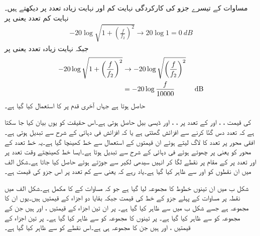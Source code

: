 مساوات  کے تیسرے جزو  کی کارکردگی نہایت کم اور نہایت زیادہ تعدد پر دیکھتے ہیں۔نہایت کم تعدد یعنی  پر
\begin{align} \label{مساوات_تعدد_ردعمل_بوڈا_کم_تعدد_تیسرا_حصہ}
-20 \log \sqrt{1+\left(\frac{f}{f_2}\right)^2} \to 20 \log 1 =\SI{0}{dB}
\end{align}
جبکہ نہایت زیادہ تعدد یعنی  پر 
\begin{gather}
\begin{aligned} \label{مساوات_تعدد_ردعمل_بوڈا_زیادہ_تعدد_تیسرا_حصہ}
-20 \log  \sqrt{1+\left(\frac{f}{f_2}\right)^2} &\to -20 \log \sqrt{\left(\frac{f}{f_2}\right)^2} \\
&=-20 \log \frac{f}{10000} \hspace{1 cm} \SI{}{dB}
\end{aligned}
\end{gather}
حاصل ہوتا ہے  جہاں آخری قدم پر  کا استعمال کیا گیا ہے۔

 کی قیمت ، ،  اور  کے تعدد پر ، ،  اور  ڈیسی بیل حاصل ہوتی ہے۔اس حقیقت کو یوں بیان کیا جا سکتا ہے کہ تعدد دس گنّا کرنے سے افزائش  گھٹتی ہے یا کہ افزائش   فی دہائی کے شرح سے تبدیل ہوتی ہے۔ افقی محور پر تعدد کا لاگ لیتے ہوئے ان قیمتوں کے استعمال سے خط کھینچا گیا ہے۔یہ خط تعدد کے محور کو  یعنی  پر چھوتے ہوئے  فی دہائی کے شرح سے تبدیل ہوتا ہے۔ایسا خط کھینچتے وقت  تعدد پر  اور  تعدد پر   کے مقام پر نقطے  لگا کر انہیں سیدھی لکیر سے جوڑتے ہوئے حاصل کیا جاتا ہے۔شکل  الف  میں ان نقطوں کو  اور  سے ظاہر کیا گیا ہے۔یاد رہے کہ  یعنی  سے کم تعدد پر اس جزو کی قیمت  ہے۔

شکل  ب میں ان تینوں خطوط کا مجموعہ لیا گیا ہے جو کہ مساوات   کے  کا مکمل  ہے۔شکل  الف میں نقطہ  پر  مساوات  کے پہلے جزو کے خط کی قیمت  جبکہ بقایا دو اجزاء کے قیمتیں  ہیں۔یوں ان کا مجموعہ  ہے جسے شکل  ب میں   سے ظاہر کیا گیا ہے۔ پر ان تین اجزاء کے قیمتیں ،  اور  ہیں جن کے مجموعہ  کو  سے ظاہر کیا گیا ہے۔ پر تینوں کا مجموعہ  کو  سے ظاہر کیا گیا ہے۔ پر تین اجزاء کے قیمتیں ،  اور  ہیں جن کا مجموعہ  ہی ہے۔اس نقطے  کو  سے ظاہر کیا گیا ہے۔


